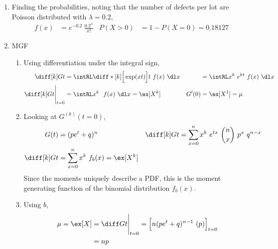 \begin{enumerate}
    \item Finding the probabilities, noting that the number of defects per lot are
          Poisson distributed with $ \lambda = 0.2 $,
          \begin{align}
              f(x)     & = e^{-0.2}\ \frac{0.2^x}{x!} &
              P(X > 0) & = 1 - P(X = 0) = 0.18127
          \end{align}

    \item MGF
          \begin{enumerate}
              \item Using differentiation under the integral sign,
                    \begin{align}
                        \diff[k] Gt   & = \intRL \diff*[k]{\Big[\exp(xt)\Big]}{t}
                        \ f(x)\ \dl x &
                                      & = \intRL x^k\ e^{kt}\ f(x)\ \dl x           \\
                        \diff[k] Gt \Bigg|_{t=0}
                                      & = \intRL x^k\ \ f(x)\ \dl x = \ex[X^k]    &
                        G'(0)         & = \ex[X^1] = \mu
                    \end{align}

              \item Looking at $ G^{(k)}(t=0) $,
                    \begin{align}
                        G(t)        & = (pe^t+q)^n                               &
                        \diff[k] Gt & = \sum_{x=0}^{n} x^k\ e^{tx}\ \binom{n}{x}
                        \ p^x\ q^{n-x}                                             \\
                        \diff[k] Gt & = \sum_{x=0}^{n} x^k\ f_b(x) = \ex[X^k]
                    \end{align}
                    Since the moments uniquely describe a PDF, this is the moment
                    generating function of the binomial distribution $ f_b(x) $.

              \item Using $ b $,
                    \begin{align}
                        \mu = \ex[X] & = \diff Gt \Bigg|_{t=0}
                        = \Big[n(pe^t + q)^{n-1}\ (p)\Big]_{t=0} \\
                                     & = np
                    \end{align}


\end{enumerate}
\end{enumerate}
